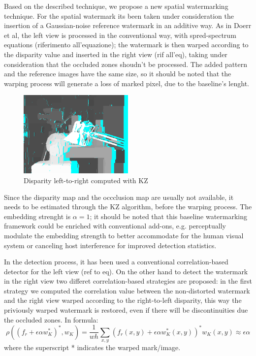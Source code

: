 Based on the described technique, we propose a new spatial watermarking technique. \newline
For the spatial watermark its been taken under consideration the insertion of a Gaussian-noise reference watermark in an additive way.\newline
As in Doerr et al, the left view is processed in the conventional way, with spred-spectrum equations (riferimento all'equazione); the watermark is then warped according to the disparity value and inserted in the right view (rif all'eq), taking under consideration that the occluded zones shoudn't be processed.\newline
The added pattern and the reference images have the same size, so it should be noted that the warping process will generate a loss of marked pixel, due to the baseline's lenght.\newline
\begin{figure}[h!]
\centering
\includegraphics[width=0.5\textwidth]{./img/disp_left_to_right.png}
\caption{\small{Disparity left-to-right computed with KZ}}
\label{fig:kzdisplr}
\end{figure}
Since the disparity map and the occclusion map are usually not available, it needs to be estimated through the KZ algorithm, before the warping process.\newline
The embedding strenght is $\alpha=1$; it should be noted that this baseline watermarking framework could be enriched with conventional add-ons, e.g. perceptually modulate the embedding strength to better accommodate for the human visual system or canceling host interference for improved detection statistics.\newline

In the detection process, it has been used a conventional correlation-based detector for the left view (ref to eq).\newline 
On the other hand to detect the watermark in the right view two differet correlation-based strategies are proposed:
in the first strategy we computed the correlation value between the non-distorted watermark and the right view warped according to the right-to-left disparity, this way the priviously warped watermark is restored, even if there will be discontinuities due the occluded zones. In formula:
$$\rho((f_{r}+\epsilon\alpha w_{K}^{*})^{*},w_{K})= \frac{1}{wh}\sum_{x,y}(f_{r}(x,y)+\epsilon\alpha w_{K}^{*}(x,y))^{*}w_{K}(x,y)\approx\epsilon\alpha $$
where the superscript * indicates the warped mark/image.\newline

